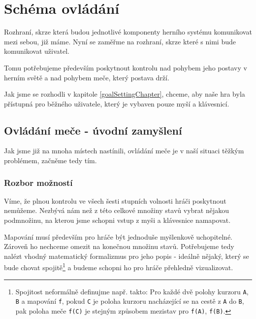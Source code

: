 


\section{Schéma ovládání} 

Rozhraní, skrze která budou jednotlivé komponenty herního systému komunikovat mezi sebou, již máme. Nyní se zaměřme na rozhraní, skrze které s nimi bude komunikovat uživatel.

Tomu potřebujeme především poskytnout kontrolu nad pohybem jeho postavy v herním světě a nad pohybem meče, který postava drží.

Jak jsme se rozhodli v kapitole \ref{goalSettingChapter}, chceme, aby naše hra byla přístupná pro běžného uživatele, který je vybaven pouze myší a klávesnicí.

\subsection{Ovládání meče - úvodní zamyšlení}

Jak jsme již na mnoha místech nastínili, ovládání meče je v naší situaci těžkým problémem, začněme tedy tím. 

\subsubsection*{Rozbor možností}

Víme, že plnou kontrolu ve všech šesti stupních volnosti hráči poskytnout nemůžeme. Nezbývá nám než z této celkové množiny stavů vybrat nějakou podmnožinu, na kterou jsme schopni vstup z myši a klávesnice namapovat.

Mapování musí především pro hráče být jednoduše myšlenkově uchopitelné. Zároveň ho nechceme omezit na konečnou množinu stavů. Potřebujeme tedy nalézt vhodný matematický formalizmus pro jeho popis - ideálně nějaký, který se bude chovat spojitě\footnote{Spojitost neformálně definujme např. takto: Pro každé dvě polohy kurzoru \texttt{A}, \texttt{B} a mapování \texttt{f}, pokud \texttt{C} je poloha kurzoru nacházející se na cestě z \texttt{A} do \texttt{B}, pak poloha meče \texttt{f(C)} je stejným způsobem mezistav pro \texttt{f(A)}, \texttt{f(B)}.} a budeme schopni ho pro hráče přehledně vizualizovat. 

